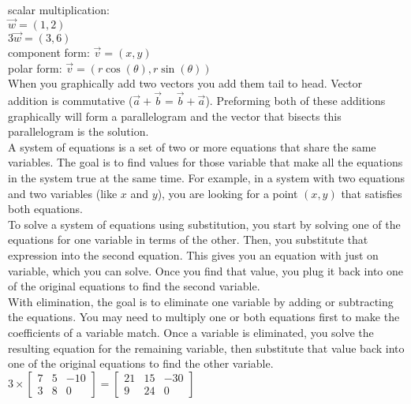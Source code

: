 \documentclass{article}
\begin{document}
scalar multiplication:\\
$\vec{w} = (1 , 2)$\\
$3\vec{w} = (3, 6)$\\

component form: $\vec{v} = (x, y)$\\
polar form: $\vec{v} = (r\cos(\theta), r\sin(\theta))$\\

When you graphically add two vectors you add them tail to head. Vector addition is commutative ($\vec{a} + \vec{b} = \vec{b} + \vec{a}$). Preforming both of these additions graphically will form a parallelogram and the vector that bisects this parallelogram is the solution.\\ 

A system of equations is a set of two or more equations that share the same variables. The goal is to find values for those variable that make all the equations in the system true at the same time. For example, in a system with two equations and two variables (like $x$ and $y$), you are looking for a point $(x, y)$ that satisfies both equations.\\

To solve a system of equations using substitution, you start by solving one of the equations for one variable in terms of the other. Then, you substitute that expression into the second equation. This gives you an equation with just on variable, which you can solve. Once you find that value, you plug it back into one of the original equations to find the second variable.\\

With elimination, the goal is to eliminate one variable by adding or subtracting the equations. You may need to multiply one or both equations first to make the coefficients of a variable match. Once a variable is eliminated, you solve the resulting equation for the remaining variable, then substitute that value back into one of the original equations to find the other variable.\\

$3 \times
\begin{bmatrix}
	7 & 5 & -10\\
	3 & 8 & 0
\end{bmatrix}
=
\begin{bmatrix}
	21 & 15 & -30\\
	9 & 24 & 0
\end{bmatrix}
$\\
\end{document}
